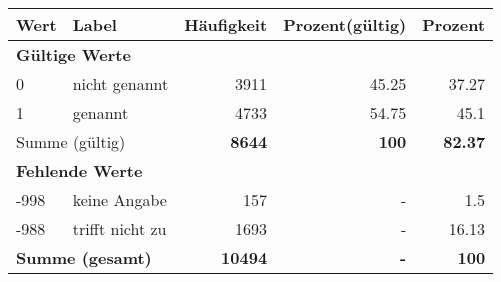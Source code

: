      \begin{longtable}{lXrrr}
     \toprule
     \textbf{Wert} & \textbf{Label} & \textbf{Häufigkeit} & \textbf{Prozent(gültig)} & \textbf{Prozent} \\
     \endhead
     \midrule
     \multicolumn{5}{l}{\textbf{Gültige Werte}}\\

     0 &
     \multicolumn{1}{X}{ nicht genannt   } &


       \num{3911} &
       \num[round-mode=places,round-precision=2]{45,25} &
         \num[round-mode=places,round-precision=2]{37,27} \\

     1 &
     \multicolumn{1}{X}{ genannt   } &


       \num{4733} &
       \num[round-mode=places,round-precision=2]{54,75} &
         \num[round-mode=places,round-precision=2]{45,1} \\
     \midrule
     \multicolumn{2}{l}{Summe (gültig)} &
       \textbf{\num{8644}} &
     \textbf{100} &
       \textbf{\num[round-mode=places,round-precision=2]{82,37}} \\
     \multicolumn{5}{l}{\textbf{Fehlende Werte}}\\
       -998 &
       keine Angabe &
         \num{157} &
        - &
         \num[round-mode=places,round-precision=2]{1,5} \\
       -988 &
       trifft nicht zu &
         \num{1693} &
        - &
         \num[round-mode=places,round-precision=2]{16,13} \\
     \midrule
     \multicolumn{2}{l}{\textbf{Summe (gesamt)}} &
          \textbf{\num{10494}} &
        \textbf{-} &
        \textbf{100} \\
     \bottomrule
     \end{longtable}
     
